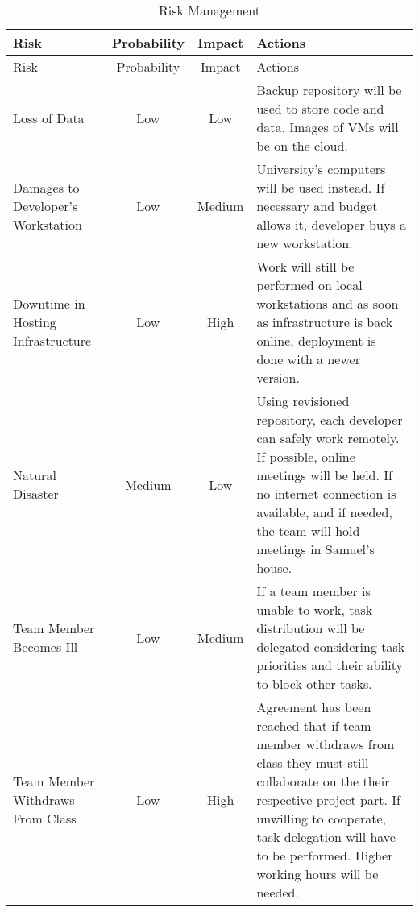 \setlength{\extrarowheight}{1.5pt}
    \begin{longtable}{|m{4.5cm}|c|c|m{6cm}|}
 \caption{Risk Management} \\
     \hline
    
    \centering  Risk & Probability & Impact & Actions \\
    \hline \hline \endfirsthead
    
         \hline

	\centering  Risk & Probability & Impact & Actions \\    
	\hline \hline \endhead
    
    \endfoot  
Loss of Data    & Low           & Low      & Backup repository will be used to store code and data. Images of VMs will be on the cloud.       \\ \hline
Damages to Developer's Workstation  & Low           & Medium      & University's computers will be used instead. If necessary and budget allows it, developer buys a new workstation.       \\  \hline
    Downtime in Hosting Infrastructure & Low           & High      & Work will still be performed on local workstations and as soon as infrastructure is back online, deployment is done with a newer version.       \\  \hline
    Natural Disaster    & Medium           & Low      & Using revisioned repository, each developer can safely work remotely. If possible, online meetings will be held. If no internet connection is available, and if needed, the team will hold meetings in Samuel's house.       \\  \hline
    Team Member Becomes Ill    & Low           & Medium      & If a team member is unable to work, task distribution will be delegated considering task priorities and their ability to block other tasks.       \\  \hline
    Team Member Withdraws From Class   & Low           & High      & Agreement has been reached that if team member withdraws from class they must still collaborate on the their respective project part. If unwilling to cooperate, task delegation will have to be performed. Higher working hours will be needed.       \\  \hline
\end{longtable}